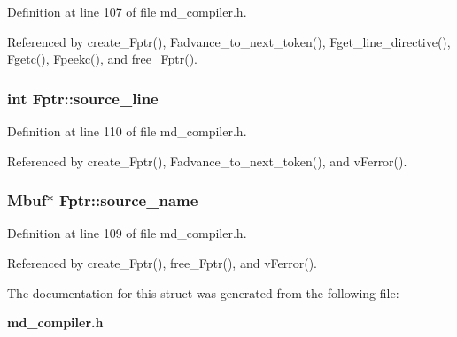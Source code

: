 Definition at line 107 of file md\_\-compiler.h.

Referenced by create\_\-Fptr(), Fadvance\_\-to\_\-next\_\-token(), Fget\_\-line\_\-directive(), Fgetc(), Fpeekc(), and free\_\-Fptr().
\subsubsection{\setlength{\rightskip}{0pt plus 5cm}int \bf{Fptr::source\_\-line}}\label{structFptr_212c70f02f3ebf06dd2effc3fafca5db}




Definition at line 110 of file md\_\-compiler.h.

Referenced by create\_\-Fptr(), Fadvance\_\-to\_\-next\_\-token(), and v\-Ferror().
\subsubsection{\setlength{\rightskip}{0pt plus 5cm}\bf{Mbuf}$\ast$ \bf{Fptr::source\_\-name}}\label{structFptr_a8d1874176483110dcd232ff6efea824}




Definition at line 109 of file md\_\-compiler.h.

Referenced by create\_\-Fptr(), free\_\-Fptr(), and v\-Ferror().

The documentation for this struct was generated from the following file:\begin{CompactItemize}
\item 
\bf{md\_\-compiler.h}\end{CompactItemize}
